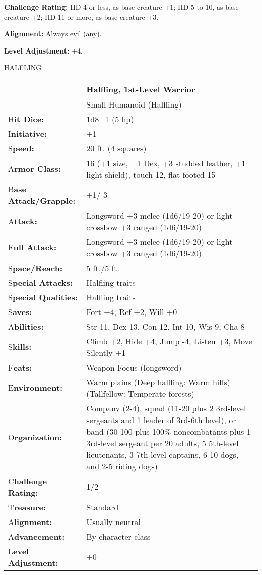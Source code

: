 \documentclass{article}
\begin{document}
\textbf{Challenge Rating:} HD 4 or less, as base creature +1; HD 5 to 10, as base 
creature +2; HD 11 or more, as base creature +3.

\textbf{Alignment:} Always evil (any).

\textbf{Level Adjustment:} +4.

\vspace{12pt}
{\LARGE{}HALFLING}

\begin{tabular}{|>{\raggedright}p{72pt}|>{\raggedright}p{253pt}|}
\hline
  & H\textbf{alfling, 1st-Level Warrior}\tabularnewline
\hline
  & Small Humanoid (Halfling)\tabularnewline
\hline
H\textbf{it Dice:} & 1d8+1 (5 hp)\tabularnewline
\hline
I\textbf{nitiative:} & +1\tabularnewline
\hline
S\textbf{peed:} & 20 ft. (4 squares)\tabularnewline
\hline
A\textbf{rmor Class:} & 16 (+1 size, +1 Dex, +3 studded leather, +1 light shield), 
touch 12, flat-footed 15\tabularnewline
\hline
B\textbf{ase Attack/Grapple:} & +1/-3\tabularnewline
\hline
A\textbf{ttack:} & Longsword +3 melee (1d6/19-20) or light crossbow +3 ranged (1d6/19-20)\tabularnewline
\hline
F\textbf{ull Attack:} & Longsword +3 melee (1d6/19-20) or light crossbow +3 ranged 
(1d6/19-20)\tabularnewline
\hline
S\textbf{pace/Reach:} & 5 ft./5 ft.\tabularnewline
\hline
S\textbf{pecial Attacks:} & Halfling traits\tabularnewline
\hline
S\textbf{pecial Qualities:} & Halfling traits\tabularnewline
\hline
S\textbf{aves:} & Fort +4, Ref +2, Will +0\tabularnewline
\hline
A\textbf{bilities:} & Str 11, Dex 13, Con 12, Int 10, Wis 9, Cha 8\tabularnewline
\hline
S\textbf{kills:} & Climb +2, Hide +4, Jump -4, Listen +3, Move Silently +1\tabularnewline
\hline
F\textbf{eats:} & Weapon Focus (longsword)\tabularnewline
\hline
E\textbf{nvironment:} & Warm plains\linebreak{}
(Deep halfling: Warm hills)\linebreak{}
(Tallfellow: Temperate forests)\tabularnewline
\hline
O\textbf{rganization:} & Company (2-4), squad (11-20 plus 2 3rd-level sergeants 
and 1 leader of 3rd-6th level), or band (30-100 plus 100\% noncombatants plus 1 
3rd-level sergeant per 20 adults, 5 5th-level lieutenants, 3 7th-level captains, 
6-10 dogs, and 2-5 riding dogs)\tabularnewline
\hline
C\textbf{hallenge Rating:} & 1/2\tabularnewline
\hline
T\textbf{reasure:} & Standard\tabularnewline
\hline
A\textbf{lignment:} & Usually neutral\tabularnewline
\hline
A\textbf{dvancement:} & By character class\tabularnewline
\hline
L\textbf{evel Adjustment:} & +0\tabularnewline
\hline
\end{tabular}
\end{document}
